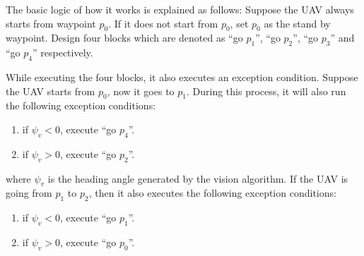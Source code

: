 The basic logic of how it works is explained as follows:
Suppose the \ac{UAV} always starts from waypoint $p_0$. If it does not start from $p_0$, set $p_0$ as the stand by waypoint. Design four blocks which are denoted as ``go $p_1$'', ``go $p_2$'', ``go $p_3$'' and ``go $p_4$'' respectively. 

While executing the four blocks, it also executes an exception condition. Suppose the \ac{UAV} starts from $p_0$, now it goes to $p_1$. During this process, it will also run 
the following exception conditions:
\begin{enumerate}
\item if $\psi_v<0$, execute ``go $p_4$''.
\item if $\psi_v>0$, execute ``go $p_2$''.
\end{enumerate}
%
where $\psi_v$ is the heading angle generated by the vision algorithm.
If the \ac{UAV} is going from $p_1$ to $p_2$, then it also executes the following exception conditions:
\begin{enumerate}
\item if $\psi_v<0$, execute ``go $p_1$''.
\item if $\psi_v>0$, execute ``go $p_0$''.
\end{enumerate}



